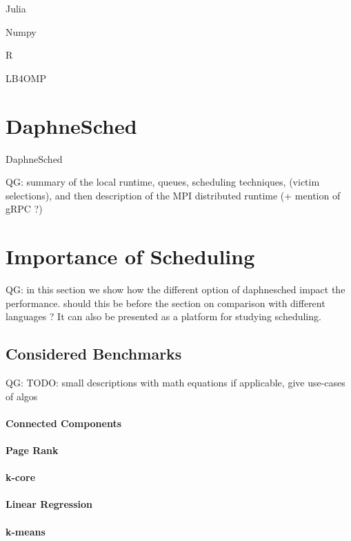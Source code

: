 \documentclass[conference,10pt]{IEEEtran}
\newcommand{\qg}[1]{{\color{blue} QG: #1}} %
\begin{document}
Julia \cite{bezanson2012julia}

Numpy \cite{harris2020array}

R \cite{morandat2012evaluating}

LB4OMP \cite{korndorfer2021lb4omp}

\section{DaphneSched}

DaphneSched \cite{eleliemy2023daphnesched}

\qg{summary of the local runtime, queues, scheduling techniques, (victim selections), and then description of the MPI distributed runtime (+ mention of gRPC ?)}

\section{Importance of Scheduling}

\qg{in this section we show how the different option of daphnesched impact the performance. should this be before the section on comparison with different languages ?
It can also be presented as a platform for studying scheduling.
}

\subsection{Considered Benchmarks}

\qg{TODO: small descriptions with math equations if applicable, give use-cases of algos}

\paragraph{Connected Components}

\paragraph{Page Rank}

\paragraph{k-core}

\paragraph{Linear Regression}

\paragraph{k-means}
\end{document}
